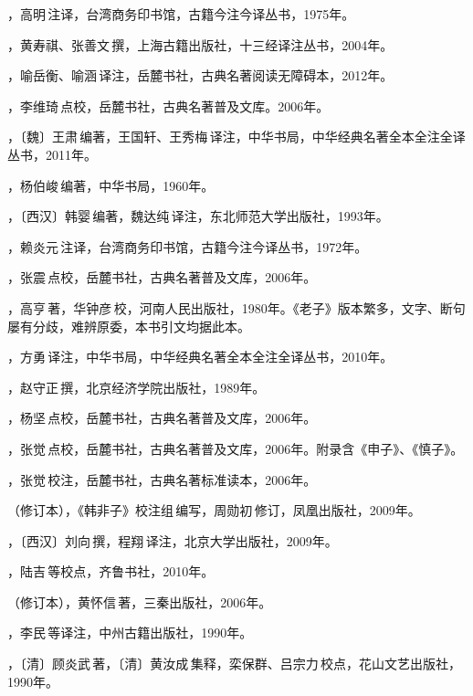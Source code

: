 ，高明\,注译，台湾商务印书馆，古籍今注今译丛书，1975年。

，黄寿祺、张善文\,撰，上海古籍出版社，十三经译注丛书，2004年。

，喻岳衡、喻涵\,译注，岳麓书社，古典名著阅读无障碍本，2012年。

，李维琦\,点校，岳麓书社，古典名著普及文库。2006年。

，〔魏〕王肃\,编著，王国轩、王秀梅\,译注，中华书局，中华经典名著全本全注全译丛书，2011年。

，杨伯峻\,编著，中华书局，1960年。

，〔西汉〕韩婴\,编著，魏达纯\,译注，东北师范大学出版社，1993年。

，赖炎元\,注译，台湾商务印书馆，古籍今注今译丛书，1972年。

，张震\,点校，岳麓书社，古典名著普及文库，2006年。

，高亨\,著，华钟彦\,校，河南人民出版社，1980年。《老子》版本繁多，文字、断句屡有分歧，难辨原委，本书引文均据此本。

，方勇\,译注，中华书局，中华经典名著全本全注全译丛书，2010年。

，赵守正\,撰，北京经济学院出版社，1989年。

，杨坚\,点校，岳麓书社，古典名著普及文库，2006年。

，张觉\,点校，岳麓书社，古典名著普及文库，2006年。附录含《申子》、《慎子》。

，张觉\,校注，岳麓书社，古典名著标准读本，2006年。

（修订本），《韩非子》校注组\,编写，周勋初\,修订，凤凰出版社，2009年。

，〔西汉〕刘向\,撰，程翔\,译注，北京大学出版社，2009年。

，陆吉\,等校点，齐鲁书社，2010年。

（修订本），黄怀信\,著，三秦出版社，2006年。

，李民\,等译注，中州古籍出版社，1990年。

，〔清〕顾炎武\,著，〔清〕黄汝成\,集释，栾保群、吕宗力\,校点，花山文艺出版社，1990年。

